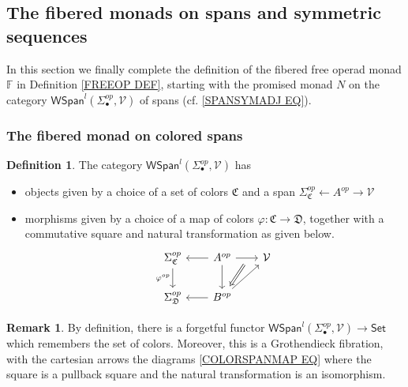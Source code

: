 \documentclass[a4paper,10pt
]{article}%
\numberwithin{equation}{section}
\numberwithin{figure}{section}
\theoremstyle{definition} %
\newtheorem{definition}[equation]{Definition}%
\newtheorem{remark}[equation]{Remark}%
\newcommand{\1}{\ensuremath{\mathbbm 1}}%
\begin{document}
\subsection{The fibered monads on spans and symmetric sequences} \label{NONEQMON SEC}

In this section we finally complete the definition of the fibered free operad monad
$\mathbb{F}$ in Definition \ref{FREEOP DEF},
starting with the promised monad $N$ on the category $\mathsf{WSpan}^l(\Sigma_{\bullet}^{op},\mathcal{V})$ of spans
(cf. \eqref{SPANSYMADJ EQ}).


\subsubsection*{The fibered monad on colored spans}



\begin{definition}\label{WSPANCAT DEF}
	The category $\mathsf{WSpan}^l(\Sigma_{\bullet}^{op},\mathcal{V})$ has
	\begin{itemize}
		\item objects given by a choice of a set of colors $\mathfrak{C}$
		and a span $\Sigma^{op}_{\mathfrak{C}} \leftarrow A^{op} \rightarrow \mathcal{V}$
		\item morphisms given by a choice of a map of colors
		$\varphi \colon \mathfrak{C} \to \mathfrak{D}$,
		together with a commutative square and natural transformation as given below.
		\begin{equation}\label{COLORSPANMAP EQ}
		\begin{tikzcd}[column sep = 20pt]
		\Sigma_{\mathfrak{C}}^{op}
		\ar{d}[swap]{\varphi^{op}} &
		A^{op}
		\ar{r}[name=U,swap]{} \ar{d} \ar{l} &
		\mathcal{V}	
		\\
		\Sigma_{\mathfrak{D}}^{op}
		&
		|[alias=V]|
		B^{op} \ar{l}
		\ar{ru}
		\arrow[Leftarrow, from=V, to=U,shorten >=0.05cm,shorten <=0.1cm]
		\end{tikzcd}
		\end{equation}
	\end{itemize}
\end{definition}



\begin{remark}
	By definition, there is a forgetful functor
	$\mathsf{WSpan}^l(\Sigma_{\bullet}^{op},\mathcal{V}) \to \mathsf{Set}$
	which remembers the set of colors.
	Moreover, this is a Grothendieck fibration, with the cartesian arrows the diagrams \eqref{COLORSPANMAP EQ} where the square is a pullback square and the natural transformation is an isomorphism.
\end{remark}
\end{document}
